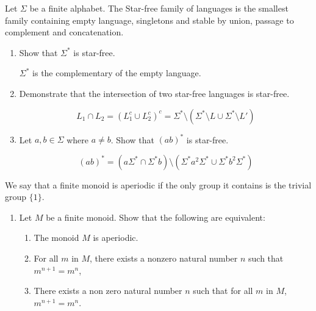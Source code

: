 \documentclass[a4paper,11pt]{exam}
\begin{document}
\begin{questions}
Let $\Sigma$ be a finite alphabet.
The Star-free  family of languages is the smallest family containing empty language, singletons and stable by union, passage to complement and concatenation.
  \begin{enumerate}
  	 \item Show that $\Sigma^*$ is star-free.
  	
  	\begin{solution}
  		$\Sigma^*$ is the complementary of the empty language.
  	\end{solution}
    \item Demonstrate that the intersection of two star-free languages is star-free.
      \begin{solution}
        \[
          L_1 \cap L_2 =(L_1^c\cup L_2^c)^c =  \Sigma^* \setminus
          (\Sigma^* \setminus L \cup \Sigma^* \setminus L')
        \]
      \end{solution}

    \item Let $a,b \in\Sigma$ where $a\neq b$. Show that $(ab)^*$ is star-free.

      \begin{solution}
        \[
          (ab)^*=(a\Sigma^* \cap \Sigma^*b) \setminus 
          (\Sigma^* a^2 \Sigma^* \cup \Sigma^* b^2 \Sigma^*)
        \]
      \end{solution}
  \end{enumerate}

  
  We say that a finite monoid is aperiodic if the only group it contains is the trivial group $\{1\}$.
  \begin{enumerate}[resume]
    \item Let $M$ be a finite monoid.
      Show that the following are equivalent:
      \begin{enumerate}
        \item The monoid $M$ is aperiodic.
        \item For all $m$ in $M$, there exists a nonzero natural number $n$  such that $m^{n+1} = m^n$,
        \item There exists a non zero natural number $n$ such that for all $m$ in $M$, $m^{n+1} = m^n$.
      \end{enumerate}


\end{enumerate}
\end{questions}
\end{document}
